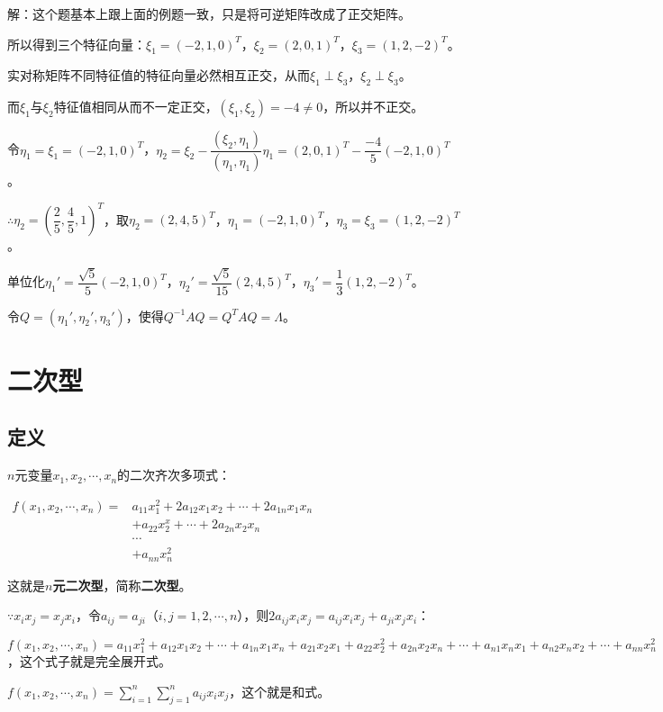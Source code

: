 \documentclass[UTF8, 12pt]{ctexart}
\begin{document}
解：这个题基本上跟上面的例题一致，只是将可逆矩阵改成了正交矩阵。

所以得到三个特征向量：$\xi_1=(-2,1,0)^T$，$\xi_2=(2,0,1)^T$，$\xi_3=(1,2,-2)^T$。

实对称矩阵不同特征值的特征向量必然相互正交，从而$\xi_1\perp\xi_3$，$\xi_2\perp\xi_3$。

而$\xi_1$与$\xi_2$特征值相同从而不一定正交，$(\xi_1,\xi_2)=-4\neq0$，所以并不正交。

令$\eta_1=\xi_1=(-2,1,0)^T$，$\eta_2=\xi_2-\dfrac{(\xi_2,\eta_1)}{(\eta_1,\eta_1)}\eta_1=(2,0,1)^T-\dfrac{-4}{5}(-2,1,0)^T$。

$\therefore\eta_2=\left(\dfrac{2}{5},\dfrac{4}{5},1\right)^T$，取$\eta_2=(2,4,5)^T$，$\eta_1=(-2,1,0)^T$，$\eta_3=\xi_3=(1,2,-2)^T$。

单位化$\eta_1'=\dfrac{\sqrt{5}}{5}(-2,1,0)^T$，$\eta_2'=\dfrac{\sqrt{5}}{15}(2,4,5)^T$，$\eta_3'=\dfrac{1}{3}(1,2,-2)^T$。

令$Q=(\eta_1',\eta_2',\eta_3')$，使得$Q^{-1}AQ=Q^TAQ=\Lambda$。

\section{二次型}

\subsection{定义}

$n$元变量$x_1,x_2,\cdots,x_n$的二次齐次多项式：

$
\begin{array}{cr}
f(x_1,x_2,\cdots,x_n)= & a_{11}x_1^2+2a_{12}x_1x_2+\cdots+2a_{1n}x_1x_n \\
& +a_{22}x_2^x+\cdots+2a_{2n}x_2x_n \\
& \cdots \\
& +a_{nn}x_n^2
\end{array}
$

这就是\textbf{$n$元二次型}，简称\textbf{二次型}。

$\because x_ix_j=x_jx_i$，令$a_{ij}=a_{ji}$（$i,j=1,2,\cdots,n$），则$2a_{ij}x_ix_j=a_{ij}x_ix_j+a_{ji}x_jx_i$：

$f(x_1,x_2,\cdots,x_n)=a_{11}x_1^2+a_{12}x_1x_2+\cdots+a_{1n}x_1x_n+a_{21}x_2x_1+a_{22}x_2^2+a_{2n}x_2x_n+\cdots+a_{n1}x_nx_1+a_{n2}x_nx_2+\cdots+a_{nn}x_n^2$，这个式子就是完全展开式。

$f(x_1,x_2,\cdots,x_n)=\sum\limits_{i=1}^n\sum\limits_{j=1}^na_{ij}x_ix_j$，这个就是和式。
\end{document}
